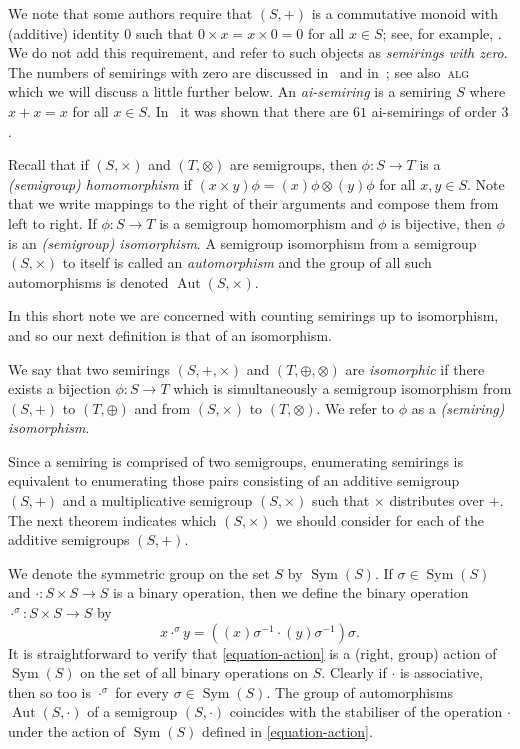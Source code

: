 \documentclass{article}
\theoremstyle{plain}
\theoremstyle{definition}
\newcommand{\alg}{\textsc{alg}~\cite{baueralg}\xspace}
\newcommand{\Sym}{\operatorname{Sym}}
\newcommand{\Aut}{\operatorname{Aut}}
\begin{document}
We note that some authors require that $(S, +)$ is a commutative monoid with
(additive) identity $0$ such that $0 \times x = x \times 0 = 0$ for
all $x\in S$; see, for example, \cite{Lothaire2005, Sakarovitch2009}. We
do not add this requirement, and refer to such objects as \textit{semirings
with zero}. The numbers of semirings with zero are discussed
in~\cite{stackexchange} and in~\cite{jipsen}; see also~\alg which we will
discuss a little further below.
An \textit{ai-semiring} is a semiring $S$ where $x + x = x$ for all $x \in S$.
In~\cite{Zhao2020} it was shown that there are
$61$ ai-semirings of order $3$.

Recall that if $(S, \times)$ and $(T, \otimes)$ are semigroups, then $\phi:S
\to T$ is a \textit{(semigroup) homomorphism} if $(x\times y)\phi =
(x)\phi\otimes (y)\phi$ for all $x, y\in S$. Note that we write mappings to the
right of their arguments and compose them from left to right. If $\phi: S \to
T$ is a semigroup homomorphism and $\phi$ is bijective, then $\phi$ is an
\textit{(semigroup) isomorphism}. A semigroup isomorphism from a semigroup
$(S, \times)$ to itself is called an \textit{automorphism}
and the group of all such automorphisms is denoted $\Aut(S, \times)$.

In this short note we are concerned with counting semirings up to isomorphism,
and so our next definition is that of an isomorphism.

\begin{defn}\label{defn-semiring-iso}
  We say that two semirings \((S,+,\times)\) and \((T, \oplus, \otimes)\) are
  \emph{isomorphic} if there exists a bijection \(\phi: S \to T\) which is
  simultaneously a semigroup isomorphism from $(S, +)$ to $(T, \oplus)$ and
  from $(S, \times)$ to $(T, \otimes)$. We refer to $\phi$ as a
  \textit{(semiring) isomorphism}.
\end{defn}

Since a semiring is comprised of two semigroups, enumerating semirings is
equivalent to enumerating those pairs consisting of an additive semigroup $(S,
+)$ and a multiplicative semigroup $(S, \times)$ such that $\times$ distributes
over $+$. The next theorem indicates which $(S, \times)$ we should consider
for each of the additive semigroups $(S, +)$.

We denote the symmetric group on the set $S$ by $\Sym(S)$. If $\sigma\in
\Sym(S)$ and $\cdot: S \times S \to S$ is a binary operation, then we define
the binary operation $\cdot ^ \sigma: S\times S \to S$ by
\begin{equation}\label{equation-action}
  x \cdot ^ \sigma y = ((x)\sigma^{-1} \cdot (y)\sigma ^ {-1})\sigma.
\end{equation}
It is straightforward to verify that \eqref{equation-action} is a (right, group)
action of $\Sym(S)$ on the set of all binary operations on $S$. Clearly if
$\cdot$ is associative, then so too is $\cdot ^ \sigma$ for every $\sigma \in
\Sym(S)$. The group of automorphisms $\Aut(S,\cdot)$ of a
semigroup $(S, \cdot)$ coincides with the stabiliser of the operation $\cdot$
under the action of $\Sym(S)$ defined in \eqref{equation-action}.
\end{document}

